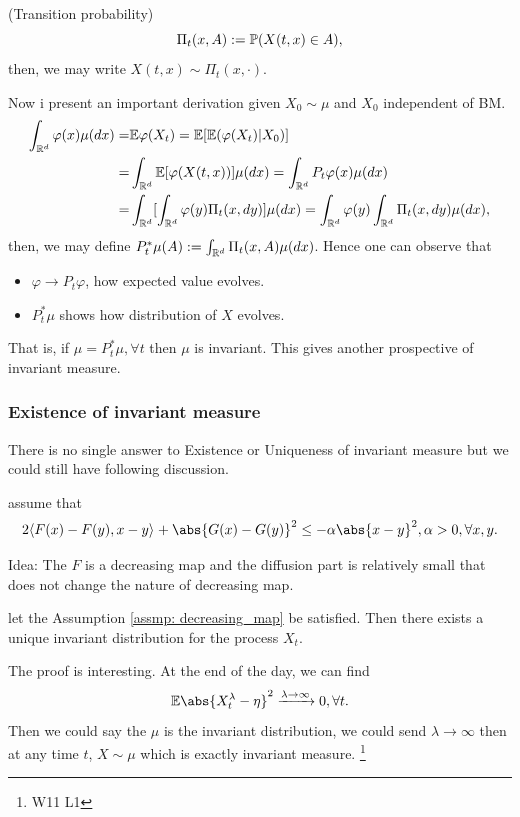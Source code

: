 \begin{dfn}{(Transition probability)}
\begin{equation*}
    \Pi_t(x, A) := \mathbb{P}(X(t,x) \in A),
\end{equation*} then, we may write $X(t,x) \sim \Pi_t(x, \cdot)$.
\end{dfn}

Now i present an important derivation given $X_0 \sim \mu$ and $X_0$ independent of BM.
\begin{align*}
    \int_{\mathbb{R}^d} \varphi(x) \mu(\mathop{}\!d x) =& \mathbb{E}\varphi(X_t) = \mathbb{E}[\mathbb{E}(\varphi(X_t)| X_0)] \\
    =& \int_{\mathbb{R}^d} \mathbb{E}[\varphi(X(t,x))] \mu(\mathop{}\!d x) = \int_{\mathbb{R}^d} P_t \varphi(x) \mu(\mathop{}\!d x) \\
    =& \int_{\mathbb{R}^d} [\int_{\mathbb{R}^d} \varphi(y) \Pi_t(x, \mathop{}\!d y)] \mu(\mathop{}\!d x) = \int_{\mathbb{R}^d} \varphi(y) \int_{\mathbb{R}^d} \Pi_t(x, \mathop{}\!d y) \mu(\mathop{}\!d x),
\end{align*}
then, we may define $P_t^*\mu(A) := \int_{\mathbb{R}^d} \Pi_t(x, A) \mu(\mathop{}\!d x) $. Hence one can observe that 
\begin{itemize}
    \item $\varphi \rightarrow P_t\varphi$, how expected value evolves.
    \item $P_t^* \mu$ shows how distribution of $X$ evolves.
\end{itemize}

That is, if $\mu = P_t^* \mu, \forall t$ then $\mu$ is invariant. This gives another prospective of invariant measure.

\subsubsection{Existence of invariant measure}
There is no single answer to Existence or Uniqueness of invariant measure but we could still have following discussion.

\begin{assmp}\label{assmp: decreasing_map}
assume that 
\begin{equation*}
    2 \qvar{F(x) - F(y), x-y}{} + \abs{G(x) - G(y)}^2 \leq -\alpha \abs{x-y}^2, \alpha >0, \forall x,y.
\end{equation*}
\end{assmp}
Idea: The $F$ is a decreasing map and the diffusion part is relatively small that does not change the nature of decreasing map.

\begin{thm}
let the Assumption \ref{assmp: decreasing_map} be satisfied. Then there exists a unique invariant distribution for the process $X_t$. 
\end{thm}
The proof is interesting. At the end of the day, we can find
\begin{equation*}
    \E \abs{X_t^\lambda - \eta}^2 \xrightarrow{\lambda \rightarrow \infty} 0, \forall t.
\end{equation*}
Then we could say the $\mu$ is the invariant distribution, we could send $\lambda \rightarrow \infty$ then at any time $t$, $X \sim \mu$ which is exactly invariant measure. \footnote{W11 L1}

